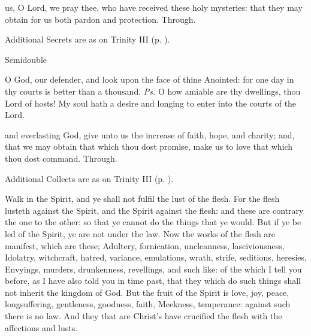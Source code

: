 \postcommunion
{} us, O Lord, we pray thee, who have received these holy mysteries: that they may obtain for us both pardon and protection. Through.
\begin{rubric}
    Additional Secrets are as on Trinity III (p. \pageref{TrinityIII}).
\end{rubric}

\begin{inhead}
{Semidouble}
\end{inhead}
\par\noindent
{}


\introit
{} O God, our defender, and look upon the face of thine Anointed: for one day in thy courts is better than a thousand. \textit{Ps.} O how amiable are thy dwellings, thou Lord of hosts! My soul hath a desire and longing to enter into the courts of the Lord.

\collect
{} and everlasting God, give unto us the increase of faith, hope, and charity; and, that we may obtain that which thou dost promise, make us to love that which thou dost command. Through.
\begin{rubric}
    Additional Collects are as on Trinity III (p. \pageref{TrinityIII}).
\end{rubric}

 Walk in the Spirit, and ye shall not fulfil the lust of the flesh. For the flesh lusteth against the Spirit, and the Spirit against the flesh: and these are contrary the one to the other: so that ye cannot do the things that ye would. But if ye be led of the Spirit, ye are not under the law. Now the works of the flesh are manifest, which are these; Adultery, fornication, uncleanness, lasciviousness, Idolatry, witchcraft, hatred, variance, emulations, wrath, strife, seditions, heresies, Envyings, murders, drunkenness, revellings, and such like: of the which I tell you before, as I have also told you in time past, that they which do such things shall not inherit the kingdom of God. But the fruit of the Spirit is love, joy, peace, longsuffering, gentleness, goodness, faith, Meekness, temperance: against such there is no law. And they that are Christ's have crucified the flesh with the affections and lusts.

